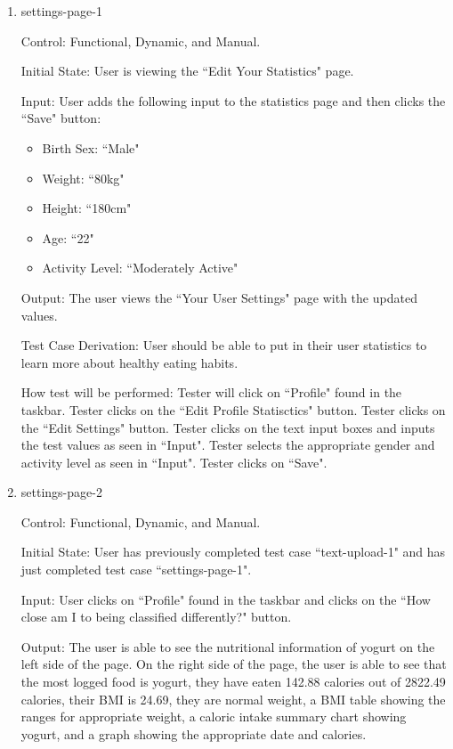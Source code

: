 \documentclass[12pt, titlepage]{article}
\begin{document}
	\begin{enumerate}
		\item{settings-page-1\\}
		
		Control: Functional, Dynamic, and Manual.
		
		Initial State: User is viewing the ``Edit Your Statistics" page.
		
		Input: User adds the following input to the statistics page and then clicks the ``Save" button:
		
		\begin{itemize}
			\item Birth Sex: ``Male"
			\item Weight: ``80kg"
			\item Height: ``180cm"
			\item Age: ``22"
			\item Activity Level: ``Moderately Active"
		\end{itemize}
		
		Output: The user views the ``Your User Settings" page with the updated values.
		
		Test Case Derivation: User should be able to put in their user statistics to learn more about healthy eating habits.
		
		How test will be performed: Tester will click on ``Profile" found in the taskbar. Tester clicks on the ``Edit Profile Statisctics" button. Tester clicks on the ``Edit Settings" button. Tester clicks on the text input boxes and inputs the test values as seen in ``Input". Tester selects the appropriate gender and activity level as seen in ``Input". Tester clicks on ``Save".
		
		\item{settings-page-2\\}
		
		Control: Functional, Dynamic, and Manual.
		
		Initial State: User has previously completed test case ``text-upload-1" and has just completed test case ``settings-page-1".
		
		Input: User clicks on ``Profile" found in the taskbar and clicks on the ``How close am I to being classified differently?" button.
		
		Output: The user is able to see the nutritional information of yogurt on the left side of the page. On the right side of the page, the user is able to see that the most logged food is yogurt, they have eaten 142.88 calories out of 2822.49 calories, their BMI is 24.69, they are normal weight, a BMI table showing the ranges for appropriate weight, a caloric intake summary chart showing yogurt, and a graph showing the appropriate date and calories.
		

\end{enumerate}
\end{document}
